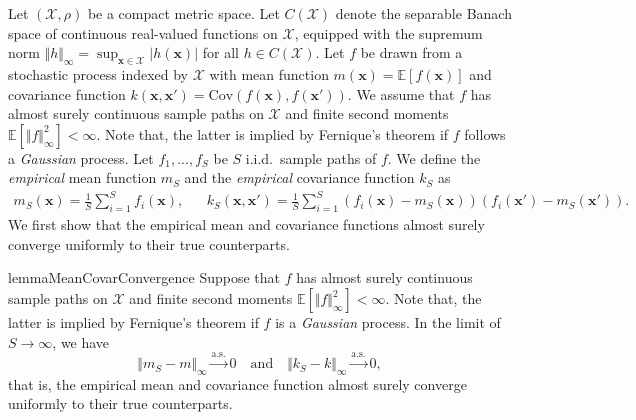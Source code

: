\documentclass{article}
\newcommand{\K}{S}
\newcommand{\domain}{\mathcal{X}}
\newcommand{\vx}{\mathbf{x}}
\newcommand{\iid}{i.i.d.\ }
\begin{document}
Let $(\domain, \rho)$ be a compact metric space.
Let $C(\domain)$ denote the separable Banach space of continuous real-valued functions on $\domain$, equipped with the supremum norm $\Vert h \Vert_{\infty} = \sup_{\vx \in \domain} | h(\vx) |$ for all $h \in C(\domain)$.
Let $f$ be drawn from a stochastic process indexed by $\domain$ with mean function $m(\vx) = \mathbb{E}[f(\vx)]$ and covariance function $k(\vx, \vx') = \mathrm{Cov}(f(\vx), f(\vx'))$.
We assume that $f$ has almost surely continuous sample paths on $\domain$ and finite second moments $\mathbb{E}[ \Vert f \Vert_{\infty}^2 ] < \infty$.
Note that, the latter is implied by Fernique's theorem \citep{fernique1970} if $f$ follows a \emph{Gaussian} process.
Let $f_1, ..., f_\K$ be $\K$ \iid sample paths of $f$.
We define the \emph{empirical} mean function $m_\K$ and the \emph{empirical} covariance function $k_{\K}$ as
\begin{align*}
    m_\K(\vx)
    = \frac{1}{\K} \sum_{i=1}^{\K} f_i(\vx), &&
    k_\K(\vx, \vx')
    = \frac{1}{\K} \sum_{i=1}^{\K} (f_i(\vx) - m_\K(\vx))(f_i(\vx') - m_\K(\vx')).
\end{align*}
We first show that the empirical mean and covariance functions almost surely converge uniformly to their true counterparts.
\begin{restatable}{lemma}{MeanCovarConvergence}
\label{thm:mean_covar_convergence}
Suppose that $f$ has almost surely continuous sample paths on $\domain$ and finite second moments $\mathbb{E}[ \Vert f \Vert_{\infty}^2 ] < \infty$.
Note that, the latter is implied by Fernique's theorem \citep{fernique1970} if $f$ is a \emph{Gaussian} process. In the limit of $\K \to \infty$, we have
\begin{equation*}
    \Vert m_\K - m \Vert_{\infty} \xrightarrow{\mathrm{a.s.}} 0
    \quad \text{and} \quad
    \Vert k_\K - k \Vert_{\infty} \xrightarrow{\mathrm{a.s.}} 0,
\end{equation*}
that is, the empirical mean and covariance function almost surely converge uniformly to their true counterparts.
\end{restatable}
\end{document}
